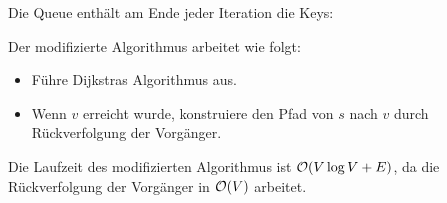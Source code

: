 \documentclass{article}
\begin{document}
\begin{solutions}
  \item Die Queue enthält am Ende jeder Iteration die Keys: 
  \item Der modifizierte Algorithmus arbeitet wie folgt: \begin{itemize}
    \item Führe Dijkstras Algorithmus aus.
    \item Wenn $v$ erreicht wurde, konstruiere den Pfad von $s$ nach $v$ durch Rückverfolgung der Vorgänger.
  \end{itemize}
  Die Laufzeit des modifizierten Algorithmus ist $\mathcal{O}(V \log V + E)$, da die Rückverfolgung der Vorgänger in $\mathcal{O}(V)$ arbeitet.
\end{solutions}
\end{document}
